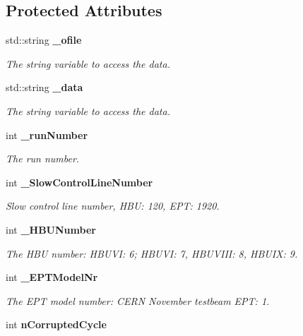 \subsection*{Protected Attributes}
\begin{DoxyCompactItemize}
\item 
std::string {\bf \_\-ofile}
\begin{DoxyCompactList}\small\item\em The string variable to access the data. \item\end{DoxyCompactList}\item 
std::string {\bf \_\-data}\label{classmarlin_1_1LabviewConverter2_a5256b6a520932eda9430b64bdc57d983}

\begin{DoxyCompactList}\small\item\em The string variable to access the data. \item\end{DoxyCompactList}\item 
int {\bf \_\-runNumber}\label{classmarlin_1_1LabviewConverter2_a296e5632f4f412b507918e716198644a}

\begin{DoxyCompactList}\small\item\em The run number. \item\end{DoxyCompactList}\item 
int {\bf \_\-SlowControlLineNumber}\label{classmarlin_1_1LabviewConverter2_ad4d497210ab5766096e996e31c6d4230}

\begin{DoxyCompactList}\small\item\em Slow control line number, HBU: 120, EPT: 1920. \item\end{DoxyCompactList}\item 
int {\bf \_\-HBUNumber}
\begin{DoxyCompactList}\small\item\em The HBU number: HBUVI: 6; HBUVI: 7, HBUVIII: 8, HBUIX: 9. \item\end{DoxyCompactList}\item 
int {\bf \_\-EPTModelNr}\label{classmarlin_1_1LabviewConverter2_acb3e4506ca6a43017cfa26efa5170b99}

\begin{DoxyCompactList}\small\item\em The EPT model number: CERN November testbeam EPT: 1. \item\end{DoxyCompactList}\item 
int {\bf nCorruptedCycle}\label{classmarlin_1_1LabviewConverter2_a51f65918a12c7a77d03eba15a7d049cd}


\end{DoxyCompactItemize}
